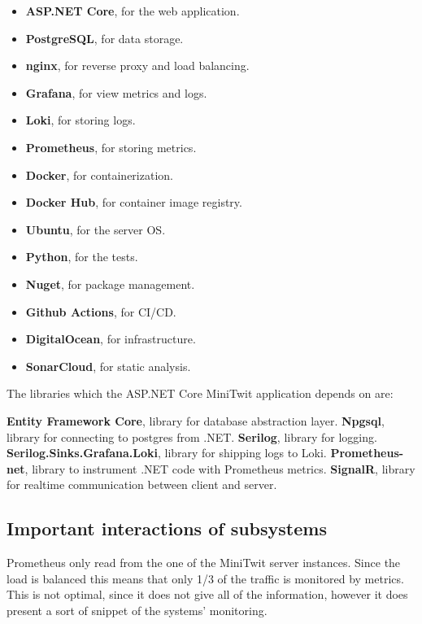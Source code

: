 \begin{itemize}
    \item \textbf{ASP.NET Core}, for the web application.
    \item \textbf{PostgreSQL}, for data storage.
    \item \textbf{nginx}, for reverse proxy and load balancing.
    \item \textbf{Grafana}, for view metrics and logs.
    \item \textbf{Loki}, for storing logs.
    \item \textbf{Prometheus}, for storing metrics.
    \item \textbf{Docker}, for containerization.
    \item \textbf{Docker Hub}, for container image registry.
    \item \textbf{Ubuntu}, for the server OS.
    \item \textbf{Python}, for the tests.
    \item \textbf{Nuget}, for package management.
    \item \textbf{Github Actions}, for CI/CD.
    \item \textbf{DigitalOcean}, for infrastructure.
    \item \textbf{SonarCloud}, for static analysis.
\end{itemize}

\noindent The libraries which the ASP.NET Core MiniTwit application depends on are:

\begin{outline}
    \1 \textbf{Entity Framework Core}, library for database abstraction layer.
    \1 \textbf{Npgsql}, library for connecting to postgres from .NET.
    \1 \textbf{Serilog}, library for logging.
    \1 \textbf{Serilog.Sinks.Grafana.Loki}, library for shipping logs to Loki.
    \1 \textbf{Prometheus-net}, library to instrument .NET code with Prometheus metrics.
    \1 \textbf{SignalR}, library for realtime communication between client and server.
\end{outline}

\subsection{Important interactions of subsystems}

Prometheus only read from the one of the MiniTwit server instances. Since the load is balanced this means that only 1/3 of the traffic is monitored by metrics. This is not optimal, since it does not give all of the information, however it does present a sort of snippet of the systems' monitoring.

